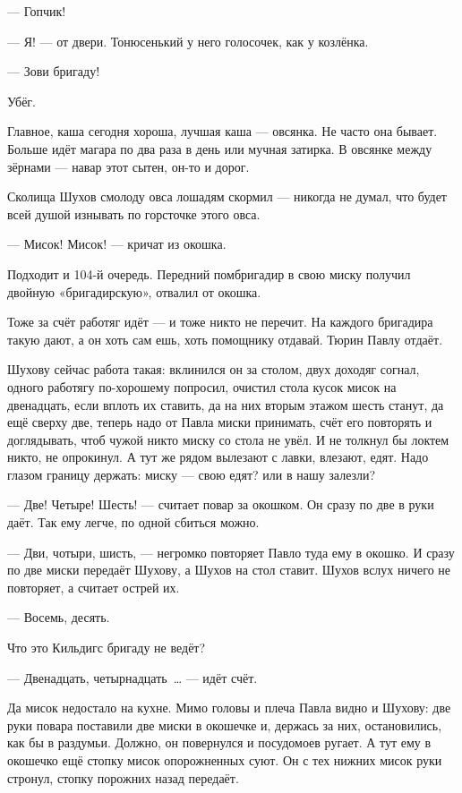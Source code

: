 --- Гопчик!

--- Я! --- от двери. Тонюсенький у него голосочек, как у козлёнка.

--- Зови бригаду!

Убёг.

Главное, каша сегодня хороша, лучшая каша --- овсянка. Не часто она бывает. Больше идёт магара 
по два раза в день или мучная затирка. В овсянке между зёрнами --- навар этот сытен, он-то и 
дорог.

Сколища Шухов смолоду овса лошадям скормил --- никогда не думал, что будет всей душой 
изнывать по горсточке этого овса.

--- Мисок! Мисок! --- кричат из окошка.

Подходит и 104-й очередь. Передний помбригадир в свою миску получил двойную «бригадирскую», 
отвалил от окошка.

Тоже за счёт работяг идёт --- и тоже никто не перечит. На каждого бригадира такую дают, а он 
хоть сам ешь, хоть помощнику отдавай. Тюрин Павлу отдаёт.

Шухову сейчас работа такая: вклинился он за столом, двух доходяг согнал, одного работягу 
по-хорошему попросил, очистил стола кусок мисок на двенадцать, если вплоть их ставить, да на 
них вторым этажом шесть станут, да ещё сверху две, теперь надо от Павла миски принимать, счёт 
его повторять и доглядывать, чтоб чужой никто миску со стола не увёл. И не толкнул бы локтем 
никто, не опрокинул. А тут же рядом вылезают с лавки, влезают, едят. Надо глазом границу 
держать: миску --- свою едят? или в нашу залезли?

--- Две! Четыре! Шесть! --- считает повар за окошком. Он сразу по две в руки даёт. Так ему легче, по 
одной сбиться можно.

--- Дви, чотыри, шисть, --- негромко повторяет Павло туда ему в окошко. И сразу по две миски 
передаёт Шухову, а Шухов на стол ставит. Шухов вслух ничего не повторяет, а считает острей их.

--- Восемь, десять.

Что это Кильдигс бригаду не ведёт?

--- Двенадцать, четырнадцать~\dots{} --- идёт счёт.

Да мисок недостало на кухне. Мимо головы и плеча Павла видно и Шухову: две руки повара 
поставили две миски в окошечке и, держась за них, остановились, как бы в раздумьи. Должно, он 
повернулся и посудомоев ругает. А тут ему в окошечко ещё стопку мисок опорожненных суют. Он с 
тех нижних мисок руки стронул, стопку порожних назад передаёт.

